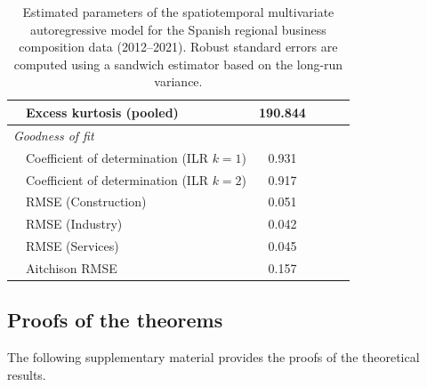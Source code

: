 \documentclass[12pt]{article}
\theoremstyle{plain}
\theoremstyle{definition}
\begin{document}
\begin{table}[t]
{\begin{tabular}{cl cccc}
& Excess kurtosis (pooled) & 190.844 &  &  &  \\
\hline
\multicolumn{6}{l}{\emph{Goodness of fit}} \\
& Coefficient of determination (ILR $k=1$) & 0.931 &  &  &  \\
& Coefficient of determination (ILR $k=2$) & 0.917 &  &  &  \\
& RMSE (Construction) & 0.051 &  &  &  \\
& RMSE (Industry) & 0.042 &  &  &  \\
& RMSE (Services) & 0.045 &  &  &  \\
& Aitchison RMSE & 0.157 &  &  &  \\
\hline
\end{tabular}
}
\caption{Estimated parameters of the spatiotemporal multivariate autoregressive model for the Spanish regional business composition data (2012--2021). Robust standard errors are computed using a sandwich estimator based on the long-run variance.}
\label{tab:results_spain}
\end{table}


\newpage


\subsection*{Proofs of the theorems}

The following supplementary material provides the proofs of the theoretical results.
\end{document}

